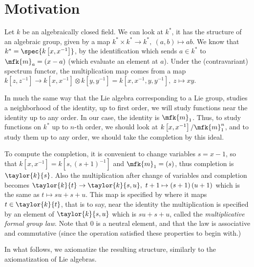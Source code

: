 \section{Motivation}

Let $k$ be an algebraically closed field.
We can look at $k^*$, it has the structure of an algebraic group, given by a map
$
	k^* \times k^* \to k^*,\ 
	\left(a,b\right) \mapsto ab
$.
We know that $k^* = \spec{k\left[x,x^{-1}\right]}$, by the identification which sends $a \in k^*$ to $\mfk{m}_a = \left(x-a\right)$ (which evaluate an element at $a$). Under the (contravariant) spectrum functor, the multiplication map comes from a map
$
	k\left[z,z^{-1}\right]
	\to
	k\left[x,x^{-1}\right] \otimes k\left[y,y^{-1}\right]
	= k\left[x,x^{-1},y,y^{-1}\right]
	,\ 
	z \mapsto xy
$.

In much the same way that the Lie algebra corresponding to a Lie group, studies a neighborhood of the identity, up to first order,
we will study functions near the identity up to any order.
In our case, the identity is $\mfk{m}_1$.
Thus, to study functions on $k^*$ up to $n$-th order, we should look at $k\left[x,x^{-1}\right] / \mfk{m}_1^n$, and to study them up to any order, we should take the completion by this ideal.

To compute the completion, it is convenient to change variables $s = x-1$, so that $k\left[x,x^{-1}\right] = k\left[s,\left(s+1\right)^{-1}\right]$ and $\mfk{m}_1 = \left(s\right)$, thus completion is $\taylor{k}{s}$.
Also the multiplication after change of variables and completion becomes
$
	\taylor{k}{t}
	\to
	\taylor{k}{s,u},\ 
	t+1 \mapsto \left(s+1\right)\left(u+1\right)
$
which is the same as $t \mapsto su+s+u$.
This map is specified by where it maps $t \in \taylor{k}{t}$,
that is to say, near the identity the multiplication is specified by an element of $\taylor{k}{s,u}$ which is $su+s+u$, called the \emph{multiplicative formal group law}.
Note that $0$ is a neutral element, and that the law is associative and commutative (since the operation satisfied these properties to begin with.)

In what follows, we axiomatize the resulting structure, similarly to the axiomatization of Lie algebras.